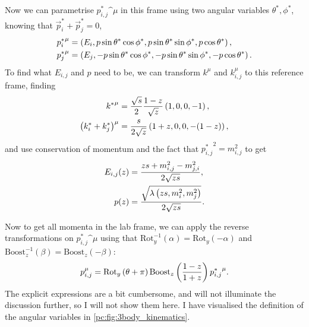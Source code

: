 \documentclass[../main.tex]{subfiles}
\begin{document}
Now we can parametrise \({p_{i,j}^\ast}\^\mu\) in this frame using two angular
variables \(\theta^\ast, \phi^\ast\), knowing that \(\vec{p}_i^\ast + \vec{p}_j^\ast =
0\),
\begin{subequations}
  \begin{align}
    {p_i^\ast}\^\mu & = \pclosed{E_i, p\sin\theta^\ast
      \cos\phi^\ast, p\sin\theta^\ast \sin\phi^\ast, p
    \cos\theta^\ast},                                   \\
    {p_j^\ast}\^\mu & = \pclosed{E_j, -p\sin\theta^\ast
      \cos\phi^\ast, -p\sin\theta^\ast \sin\phi^\ast, -p
      \cos\theta^\ast}.
  \end{align}
\end{subequations}
To find what \(E_{i,j}\) and \(p\) need to be, we can transform \(k^\mu\) and
\(k_{i,j}^\mu\) to this reference frame, finding
\begin{subequations}
  \begin{align}
    {k^\ast}\^\mu                      & = \frac{\sqrt{s}}{2}
    \frac{1-z}{\sqrt{z}} \pclosed{1, 0, 0, -1},                \\
    \pclosed{k_i^\ast + k_j^\ast}\^\mu & = \frac{s}{2\sqrt{z}}
    \pclosed{1+z, 0, 0, -(1-z)},
  \end{align}
\end{subequations}
and use conservation of momentum and the fact that \({p_{i,j}^\ast}^2 =
m^2_{i,j}\) to get
\begin{subequations}
  \begin{align}
    E_{i,j}(z) & = \frac{zs + m^2_{i,j} - m^2_{j,i}}{2 \sqrt{zs}},
    \\
    p(z)       & = \frac{\sqrt{\lambda\left(zs, m^2_i,
          m^2_j\right)}}{2 \sqrt{zs}}.
  \end{align}
\end{subequations}

Now to get all momenta in the lab frame, we can apply the reverse
transformations on \({p_{i,j}^\ast}\^\mu\) using that
\(\text{Rot}^{-1}_y(\alpha) = \text{Rot}_y(-\alpha)\) and
\(\text{Boost}_z^{-1}(\beta) = \text{Boost}_z(-\beta)\):
\begin{equation}
  p_{i,j}^\mu = \text{Rot}_y\pclosed{\theta+\pi}
  \text{Boost}_z\pclosed{\frac{1-z}{1+z}} {p_{i,j}^\ast}\^\mu.
\end{equation}
The explicit expressions are a bit cumbersome, and will not illuminate the discussion further, so I will not show them here.
I have visualised the definition of the angular variables in \cref{pc:fig:3body_kinematics}.
\end{document}

